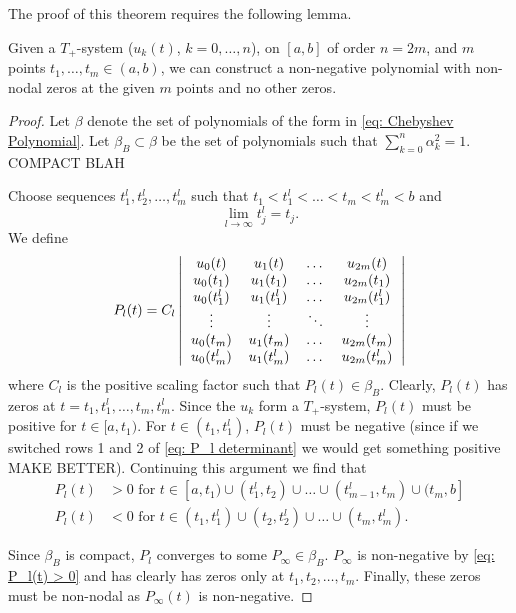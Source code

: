 The proof of this theorem requires the following lemma.
\begin{lemma}
	\label{lem: Non-negative Polynomial with m non-nondal zeros}
	Given a $T_+$-system ($u_k(t)$, $k = 0,\dots,n$), on $[a,b]$ of order $n = 2m $, and $m$ points $t_1,\dots,t_m \in (a,b)$, we can construct a non-negative polynomial with non-nodal zeros at the given $m$ points and no other zeros.
\end{lemma}
\begin{proof}
	Let $\beta$ denote the set of polynomials of the form in \eqref{eq: Chebyshev Polynomial}. Let $\beta_B \subset \beta$ be the set of polynomials such that $\sum_{k=0}^{n} \alpha_k^2 = 1$.
	COMPACT BLAH
	
	Choose sequences $t_1^l, t_2^l,\dots,t_m^l$ such that $t_1 < t_1^l<\dots<t_m<t_m^l<b$ and
	$$\lim_{l \rightarrow \infty} t_j^l = t_j.$$
	We define
	\begin{equation}
	P_l(t) = C_l \left|
	\begin{tabular}{cccc}
	$u_0(t)$ & $u_1(t)$&\dots & $u_{2m}(t)$\\
	$u_0(t_1)$ & $u_1(t_1)$&\dots & $u_{2m}(t_1)$\\
	$u_0(t_1^l)$ & $u_1(t_1^l)$&\dots & $u_{2m}(t_1^l)$\\
	\vdots & \vdots & $\ddots$ & \vdots\\
	$u_0(t_m)$ & $u_1(t_m)$&\dots & $u_{2m}(t_m)$\\
	$u_0(t_m^l)$ & $u_1(t_m^l)$&\dots & $u_{2m}(t_m^l)$
	\end{tabular}
	\right|
	\label{eq: P_l determinant}
	\end{equation}
	where $C_l$ is the positive scaling factor such that $P_l(t) \in \beta_B$. Clearly, $P_l(t)$ has zeros at $t = t_1,t_1^l,\dots,t_m,t_m^l$. Since the $u_k$ form a $T_+$-system, $P_l(t)$ must be positive for $t \in [a,t_1)$. For $t \in (t_1,t_1^l)$, $P_l(t)$ must be negative (since if we switched rows 1 and 2 of \eqref{eq: P_l determinant} we would get something positive MAKE BETTER). Continuing this argument we find that
	\begin{align}
	P_l(t) &> 0 \text{ for } t \in [a,t_1) \cup (t_1^l,t_2) \cup \dots \cup (t_{m-1}^l,t_m) \cup (t_m,b]\\
	\label{eq: P_l(t) > 0}
	P_l(t) &< 0 \text{ for } t \in (t_1,t_1^l) \cup (t_2,t_2^l) \cup \dots \cup (t_{m},t_m^l).
	\end{align}
	
	Since $\beta_B$ is compact, $P_l$ converges to some $P_\infty \in \beta_B$. $P_\infty$ is non-negative by \eqref{eq: P_l(t) > 0} and has clearly has zeros only at $t_1,t_2,\dots,t_m$. Finally, these zeros must be non-nodal as $P_\infty(t)$ is non-negative.
\end{proof}

